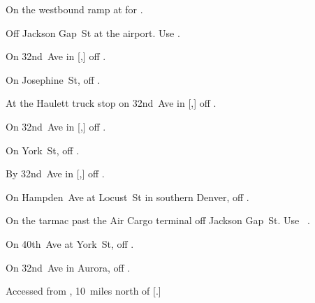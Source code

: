 
\begin{LocationList}

On the westbound ramp at   for .

Off Jackson Gap~St at the airport.
Use  .

On 32nd~Ave in [,] off  .

\Location{\GarageHQ \Garage}
On Josephine~St, off  .

At the Haulett truck stop on 32nd~Ave in [,] off  .

On 32nd~Ave in [,] off  .

On York~St, off  .

\Location{\RecruitmentAgency \Recruitment}
By 32nd~Ave in [,] off  .

On  Hampden~Ave at Locust~St in southern Denver, off  .

On the tarmac past the Air Cargo terminal off Jackson Gap~St.
Use~ .

On 40th~Ave at York~St, off  .

On 32nd~Ave in Aurora, off  .

Accessed from , 10~miles north of [.]

\end{LocationList}
